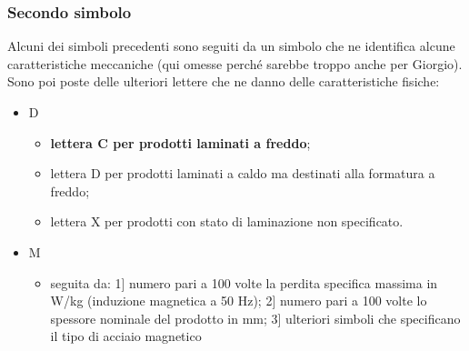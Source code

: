 \subsubsection{Secondo simbolo}

Alcuni dei simboli precedenti sono seguiti da un simbolo che ne identifica alcune caratteristiche meccaniche (qui omesse perché sarebbe troppo anche per Giorgio). Sono poi poste delle ulteriori lettere che ne danno delle caratteristiche fisiche:
\begin{itemize}
    \item D
    \begin{itemize}
         \item \textbf{lettera C per prodotti laminati a freddo};
        \item lettera D per prodotti laminati a caldo ma destinati alla formatura a freddo;
        \item lettera X per prodotti con stato di laminazione non specificato.
    \end{itemize}
    \item M
    \begin{itemize}
        \item seguita da: 1] numero pari a 100 volte la perdita specifica massima in W/kg (induzione magnetica a 50 Hz); 2] numero pari a 100 volte lo spessore nominale del prodotto in mm; 3] ulteriori simboli che specificano il tipo di acciaio magnetico 
    \end{itemize}
\end{itemize}


